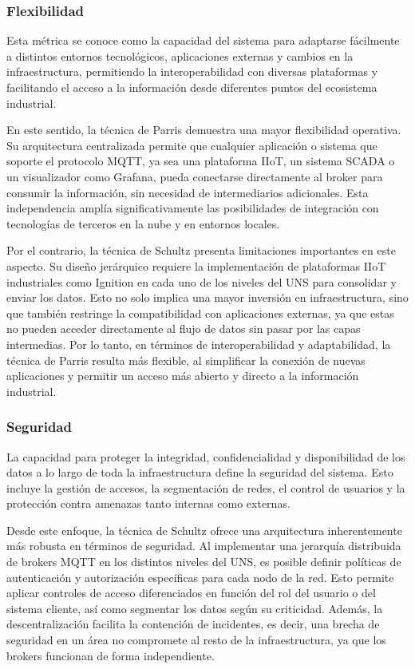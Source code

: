 \subsubsection{Flexibilidad}
Esta métrica se conoce como la capacidad del sistema para adaptarse fácilmente a distintos entornos tecnológicos, aplicaciones externas y cambios en la infraestructura, permitiendo la interoperabilidad con diversas plataformas y facilitando el acceso a la información desde diferentes puntos del ecosistema industrial.

En este sentido, la técnica de Parris demuestra una mayor flexibilidad operativa. Su arquitectura centralizada permite que cualquier aplicación o sistema que soporte el protocolo MQTT, ya sea una plataforma IIoT, un sistema SCADA o un visualizador como Grafana, pueda conectarse directamente al broker para consumir la información, sin necesidad de intermediarios adicionales. Esta independencia amplía significativamente las posibilidades de integración con tecnologías de terceros en la nube y en entornos locales.

Por el contrario, la técnica de Schultz presenta limitaciones importantes en este aspecto. Su diseño jerárquico requiere la implementación de plataformas IIoT industriales como Ignition en cada uno de los niveles del UNS para consolidar y enviar los datos. Esto no solo implica una mayor inversión en infraestructura, sino que también restringe la compatibilidad con aplicaciones externas, ya que estas no pueden acceder directamente al flujo de datos sin pasar por las capas intermedias. Por lo tanto, en términos de interoperabilidad y adaptabilidad, la técnica de Parris resulta más flexible, al simplificar la conexión de nuevas aplicaciones y permitir un acceso más abierto y directo a la información industrial.

\subsubsection{Seguridad}
La capacidad para proteger la integridad, confidencialidad y disponibilidad de los datos a lo largo de toda la infraestructura define la seguridad del sistema. Esto incluye la gestión de accesos, la segmentación de redes, el control de usuarios y la protección contra amenazas tanto internas como externas. 

Desde este enfoque, la técnica de Schultz ofrece una arquitectura inherentemente más robusta en términos de seguridad. Al implementar una jerarquía distribuida de brokers MQTT en los distintos niveles del UNS, es posible definir políticas de autenticación y autorización específicas para cada nodo de la red. Esto permite aplicar controles de acceso diferenciados en función del rol del usuario o del sistema cliente, así como segmentar los datos según su criticidad. Además, la descentralización facilita la contención de incidentes, es decir, una brecha de seguridad en un área no compromete al resto de la infraestructura, ya que los brokers funcionan de forma independiente.


